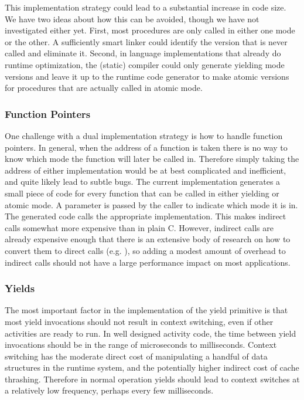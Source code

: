 \documentclass[9pt,preprint]{sigplanconf}
\begin{document}
This implementation strategy could lead to a substantial increase in code size.
We have two ideas about how this can be avoided, though we have not investigated either yet.
First, most procedures are only called in either one mode or the other.
A sufficiently smart linker could identify the version that is never called and eliminate it.
Second, in language implementations that already do runtime optimization, the (static) compiler could only generate yielding mode versions and leave it up to the runtime code generator to make atomic versions for procedures that are actually called in atomic mode.


\subsubsection{Function Pointers}

One challenge with a dual implementation strategy is how to handle function pointers.
In general, when the address of a function is taken there is no way to know which mode the function will later be called in.
Therefore simply taking the address of either implementation would be at best complicated and inefficient, and quite likely lead to subtle bugs.
The current implementation generates a small piece of code for every function that can be called in either yielding or atomic mode.
A parameter is passed by the caller to indicate which mode it is in.
The generated code calls the appropriate implementation.
This makes indirect calls somewhat more expensive than in plain C.
However, indirect calls are already expensive enough that there is an extensive body of research on how to convert them to direct calls (e.g. \cite{Dean1995}), so adding a modest amount of overhead to indirect calls should not have a large performance impact on most applications.

\subsubsection{Yields}

The most important factor in the implementation of the yield primitive is that most yield invocations should not result in context switching, even if other activities are ready to run.
In well designed activity code, the time between yield invocations should be in the range of microseconds to milliseconds.
Context switching has the moderate direct cost of manipulating a handful of data structures in the runtime system, and the potentially higher indirect cost of cache thrashing.
Therefore in normal operation yields should lead to context switches at a relatively low frequency, perhaps every few milliseconds.
\end{document}
